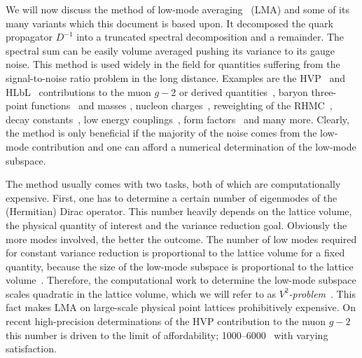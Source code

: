 We will now discuss the method of low-mode averaging~\cite{Neff_2001,DeGrand_2004,Giusti_2004,} (LMA) and some of its many variants which this document is based upon.
It decomposed the quark propagator $D^{-1}$ into a truncated spectral decomposition and a remainder.
The spectral sum can be easily volume averaged pushing its variance to its gauge noise.
This method is used widely in the field for quantities suffering from the signal-to-noise ratio problem in the long distance.
Examples are the HVP~\cite{bmw_2024,Kuberski_2023,Aubin:2022hgm,Bazavov:2024eou,RBC_2024} and HLbL~\cite{Lin:2024khg} contributions to the muon $g-2$ or derived quantities~\cite{ExtendedTwistedMass:2025tpc}, baryon three-point functions~\cite{Yang:2015zja,Ohki:2012jyg} and masses \cite{Bali:2010se}, nucleon charges~\cite{Yamanaka:2018uud}, reweighting of the RHMC~\cite{Kuberski:2023zky}, decay constants~\cite{Bali:2014pva}, low energy couplings~\cite{Bernardoni:2011kd}, form factors~\cite{JLQCD:2009ofg} and many more.
Clearly, the method is only beneficial if the majority of the noise comes from the low-mode contribution and one can afford a numerical determination of the low-mode subspace.

The method usually comes with two tasks, both of which are computationally expensive.
First, one has to determine a certain number of eigenmodes of the (Hermitian) Dirac operator.
This number heavily depends on the lattice volume, the physical quantity of interest and the variance reduction goal.
Obviously the more modes involved, the better the outcome.
The number of low modes required for constant variance reduction is proportional to the lattice volume for a fixed quantity, because the size of the low-mode subspace is proportional to the lattice volume~\cite{banks1980}.
Therefore, the computational work to determine the low-mode subspace scales quadratic in the lattice volume, which we will refer to as \emph{$V^{2}$-problem}~\cite{Luescher2007}.
This fact makes LMA on large-scale physical point lattices prohibitively expensive.
On recent high-precision determinations of the HVP contribution to the muon $g-2$ this number is driven to the limit of affordability; \numrange{1000}{6000}~\cite{Djukanovic:2024cmq,RBC_2024,bmw_2024,Aubin:2022hgm} with varying satisfaction.

